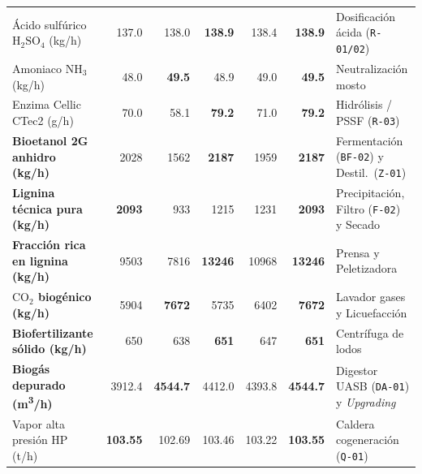 \documentclass{report}
\begin{document}
\begin{table}[H]
{\begin{tabular}{l r r r r | r l}
            Ácido sulfúrico $\mathrm{H_2SO_4}$ (\si{\kilo\gram/\hour}) & \num{137.0} & \num{138.0}        & \textbf{\num{138.9}}   & \num{138.4}          & \textbf{\num{138.9}}                 & Dosificación ácida (\texttt{R-01/02}) \\
            Amoniaco $\mathrm{NH_3}$ (\si{\kilo\gram/\hour}) & \num{48.0}            & \textbf{\num{49.5}}  & \num{48.9}             & \num{49.0}           & \textbf{\num{49.5}}                  & Neutralización mosto              \\
            Enzima Cellic CTec2 (\si{\gram/\hour})      & \num{70.0}            & \num{58.1}           & \textbf{\num{79.2}}    & \num{71.0}           & \textbf{\num{79.2}}                  & Hidrólisis / PSSF (\texttt{R-03}) \\
            \midrule
            \textbf{Bioetanol 2G anhidro (\si{\kilo\gram/\hour})} & \num{2028}        & \num{1562}           & \textbf{\num{2187}}    & \num{1959}           & \textbf{\num{2187}}                  & Fermentación (\texttt{BF-02}) y Destil.\ (\texttt{Z-01}) \\
            \textbf{Lignina técnica pura (\si{\kilo\gram/\hour})} & \textbf{\num{2093}} & \num{933}          & \num{1215}             & \num{1231}           & \textbf{\num{2093}}                  & Precipitación, Filtro (\texttt{F-02}) y Secado \\
            \textbf{Fracción rica en lignina (\si{\kilo\gram/\hour})} & \num{9503}    & \num{7816}           & \textbf{\num{13246}}   & \num{10968}          & \textbf{\num{13246}}                 & Prensa y Peletizadora             \\
            \textbf{$\text{CO}_2$ biogénico (\si{\kilo\gram/\hour})} & \num{5904}     & \textbf{\num{7672}}  & \num{5735}             & \num{6402}           & \textbf{\num{7672}}                  & Lavador gases y Licuefacción      \\
            \textbf{Biofertilizante sólido (\si{\kilo\gram/\hour})} & \num{650}       & \num{638}            & \textbf{\num{651}}     & \num{647}            & \textbf{\num{651}}                   & Centrífuga de lodos               \\
            \textbf{Biogás depurado (\si{\cubic\meter/\hour})} & \num{3912.4}         & \textbf{\num{4544.7}}& \num{4412.0}           & \num{4393.8}         & \textbf{\num{4544.7}}                & Digestor UASB (\texttt{DA-01}) y \textit{Upgrading} \\
            Vapor alta presión HP (\si{\tonne/\hour})   & \textbf{\num{103.55}} & \num{102.69}         & \num{103.46}           & \num{103.22}         & \textbf{\num{103.55}}                & Caldera cogeneración (\texttt{Q-01}) \\
            \bottomrule
        \end{tabular}%
    }
    \label{tab:caudales_horarios_dimensionamiento}
\end{table}
\end{document}
